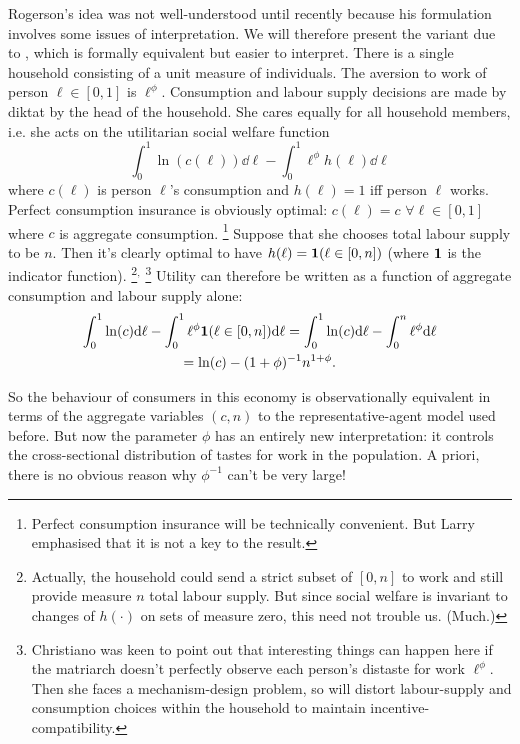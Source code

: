 \documentclass[11pt,letterpaper,reqno,oneside]{article}
\begin{document}
Rogerson's idea was not well-understood until recently because his formulation involves some issues of interpretation. We will therefore present the variant due to \textcite{Gali2011,Gali2011book}, which is formally equivalent but easier to interpret. There is a single household consisting of a unit measure of individuals. The aversion to work of person $\ell \in [0,1]$ is $\ell^\phi$. Consumption and labour supply decisions are made by diktat by the head of the household. She cares equally for all household members, i.e. she acts on the utilitarian social welfare function
%
\begin{equation*}
	\int_0^1 \ln(c(\ell)) \dd \ell - \int_0^1 \ell^\phi h(\ell) \dd \ell
\end{equation*}
%
where $c(\ell)$ is person $\ell$'s consumption and $h(\ell)=1$ iff person $\ell$ works. Perfect consumption insurance is obviously optimal: $c(\ell)=c$ $\forall \ell \in [0,1]$ where $c$ is aggregate consumption.%
	\footnote{Perfect consumption insurance will be technically convenient. But Larry emphasised that it is not a key to the result.}
Suppose that she chooses total labour supply to be $n$. Then it's clearly optimal to have $h(\ell) = \boldsymbol{1}( \ell \in [0,n] )$ (where $\boldsymbol{1}$ is the indicator function).%
	\footnote{Actually, the household could send a strict subset of $[0,n]$ to work and still provide measure $n$ total labour supply. But since social welfare is invariant to changes of $h(\cdot)$ on sets of measure zero, this need not trouble us. (Much.)}$^,$%
	\footnote{Christiano was keen to point out that interesting things can happen here if the matriarch doesn't perfectly observe each person's distaste for work $\ell^\phi$. Then she faces a mechanism-design problem, so will distort labour-supply and consumption choices within the household to maintain incentive-compatibility.}
Utility can therefore be written as a function of aggregate consumption and labour supply alone:
%
\begin{multline*}
	\int_0^1 \ln(c) \mathrm{d} \ell - \int_0^1 \ell^\phi \boldsymbol{1}( \ell \in [0,n] ) \mathrm{d} \ell
	= \int_0^1 \ln(c) \mathrm{d} \ell - \int_0^n \ell^\phi \mathrm{d} \ell
	\\
	= \ln(c) - (1+\phi)^{-1} n^{1+\phi} .
\end{multline*}

So the behaviour of consumers in this economy is observationally equivalent in terms of the aggregate variables $(c,n)$ to the representative-agent model used before. But now the parameter $\phi$ has an entirely new interpretation: it controls the cross-sectional distribution of tastes for work in the population. A priori, there is no obvious reason why $\phi^{-1}$ can't be very large!
\end{document}
